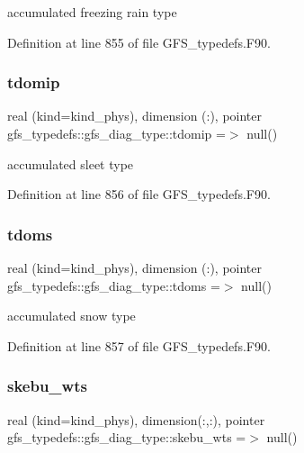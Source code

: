 accumulated freezing rain type 



Definition at line 855 of file G\+F\+S\+\_\+typedefs.\+F90.

\mbox{\label{structgfs__typedefs_1_1gfs__diag__type_a29195596c9a0fedaa4ae6abfde1cc309}} 
\subsubsection{tdomip}
{\footnotesize\ttfamily real (kind=kind\+\_\+phys), dimension (\+:), pointer gfs\+\_\+typedefs\+::gfs\+\_\+diag\+\_\+type\+::tdomip =$>$ null()}



accumulated sleet type 



Definition at line 856 of file G\+F\+S\+\_\+typedefs.\+F90.

\mbox{\label{structgfs__typedefs_1_1gfs__diag__type_ac10f49bfb215c3d97ca2316e8c9b6bc6}} 
\subsubsection{tdoms}
{\footnotesize\ttfamily real (kind=kind\+\_\+phys), dimension  (\+:), pointer gfs\+\_\+typedefs\+::gfs\+\_\+diag\+\_\+type\+::tdoms =$>$ null()}



accumulated snow type 



Definition at line 857 of file G\+F\+S\+\_\+typedefs.\+F90.

\mbox{\label{structgfs__typedefs_1_1gfs__diag__type_a36075b6ee6713ecdcf203f442d806f47}} 
\subsubsection{skebu\+\_\+wts}
{\footnotesize\ttfamily real (kind=kind\+\_\+phys), dimension(\+:,\+:), pointer gfs\+\_\+typedefs\+::gfs\+\_\+diag\+\_\+type\+::skebu\+\_\+wts =$>$ null()}



